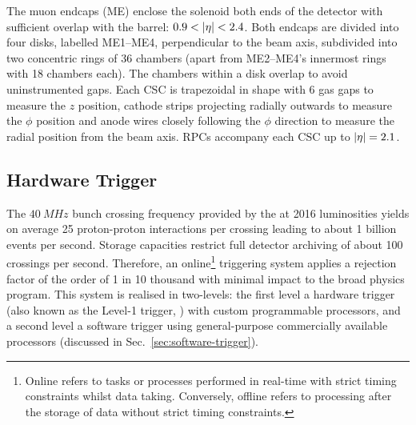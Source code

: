 The muon endcaps (ME) enclose the solenoid both ends of the \CMS detector with
sufficient overlap with the barrel: $0.9<\aeta<2.4$. Both endcaps are divided
into four disks, labelled ME1--ME4, perpendicular to the beam axis, subdivided
into two concentric rings of 36 chambers (apart from ME2--ME4's innermost
rings with 18 chambers each). The chambers within a disk overlap to avoid
uninstrumented gaps. Each CSC is trapezoidal in shape with 6 gas gaps to
measure the $z$ position, cathode strips projecting radially outwards  to
measure the $\phi$ position and anode wires closely following the $\phi$
direction to measure the radial position from the beam axis. RPCs accompany
each CSC up to $|\eta|=2.1$.

    
\subsection{Hardware Trigger}\label{sec:hardware-trigger}

The ${\SI{40}{MHz}}$ bunch crossing frequency provided by the \LHC at 2016
luminosities yields on average 25 proton-proton interactions per crossing
leading to about 1 billion events per second. Storage capacities restrict full
detector archiving of about 100 crossings per second. Therefore, an online\footnote{Online refers to tasks or processes performed in real-time with strict timing constraints whilst data taking. Conversely, offline refers to processing after the storage of data without strict timing constraints.}
triggering system applies a rejection factor of the order of 1 in 10 thousand
with minimal impact to the broad physics program. This system is realised in
two-levels: the first level a hardware trigger (also known as the Level-1
trigger, \HWT) \cite{Bayatyan:706847,Tapper:1556311} with custom programmable
processors, and a second level a software trigger \cite{Sphicas:2002gg} using
general-purpose commercially available processors (discussed in
Sec.~\ref{sec:software-trigger}).

